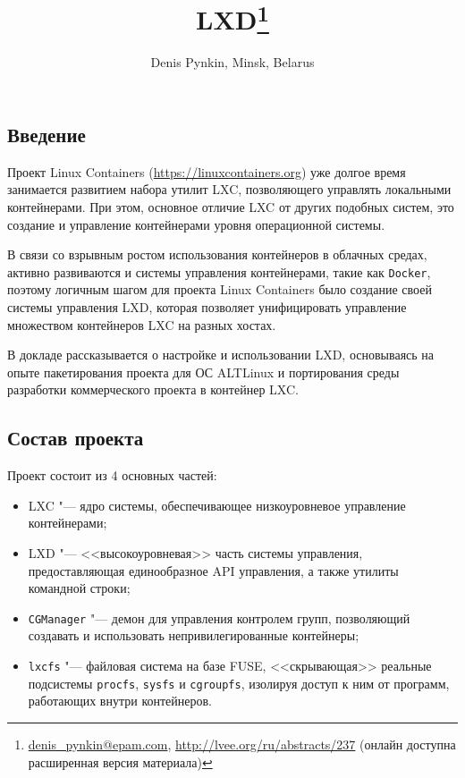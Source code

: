 \documentclass[10pt, a5paper]{article}
\title{LXD\footnote{\url{denis_pynkin@epam.com}, \url{http://lvee.org/ru/abstracts/237} (онлайн доступна расширенная версия материала)}}
\author{Denis Pynkin, Minsk, Belarus}
\begin{document}
\maketitle

\begin{abstract}

\end{abstract}

\subsection*{Введение}

Проект Linux Containers (\url{https://linuxcontainers.org}) уже долгое время занимается развитием набора утилит LXC, позволяющего управлять 
локальными контейнерами. При этом, основное отличие LXC от других подобных 
систем, это создание и управление контейнерами уровня операционной системы.

В связи со взрывным ростом использования контейнеров в облачных средах,
активно развиваются и системы управления контейнерами, такие как 
{\tt Docker}, поэтому логичным шагом для проекта Linux Containers было
создание своей системы управления LXD, которая позволяет унифицировать 
управление множеством контейнеров LXC на разных хостах.

В докладе рассказывается о настройке и использовании LXD, основываясь на опыте
пакетирования проекта для ОС ALTLinux и портирования среды разработки 
коммерческого проекта в контейнер LXC.

\subsection*{Состав проекта}

Проект состоит из 4 основных частей:
\begin{itemize}
    \item {LXC} "--- ядро системы, обеспечивающее низкоуровневое управление 
    контейнерами;
    \item {LXD} "--- <<высокоуровневая>> часть системы управления, предоставляющая
    единообразное API управления, а также утилиты командной строки;
    \item {\tt CGManager} "--- демон для управления контролем групп, позволяющий 
    создавать и использовать непривилегированные контейнеры;
    \item {\tt lxcfs} "--- файловая система на базе FUSE, <<скрывающая>> реальные 
    подсистемы {\tt procfs}, {\tt sysfs} и {\tt cgroupfs}, изолируя доступ к ним 
    от программ,  работающих внутри контейнеров.
\end{itemize}
\end{document}
